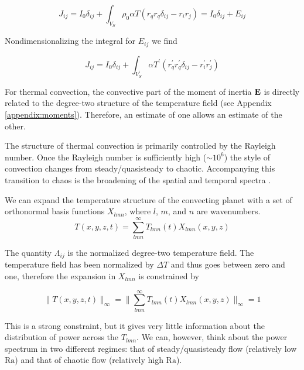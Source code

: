 \documentclass[extra,onecolumn]{gji}
\begin{document}
\begin{equation}
J_{ij} = I_0 \delta_{ij} + \int_{V_S} \rho_0 \alpha T \left( r_q r_q \delta_{ij} - r_i r_j \right) = I_0 \delta_{ij} + E_{ij} 
\end{equation}

Nondimensionalizing the integral for $E_{ij}$ we find

\begin{equation}
J_{ij} = I_0 \delta_{ij} + \int_{V_S^\prime} \alpha T^\prime \left( r_q^\prime r_q^\prime \delta_{ij} - r_i^\prime r_j^\prime \right) 
\end{equation}


For thermal convection, the convective part of the moment of inertia $\bf E$ is directly related to the degree-two structure of the temperature field (see Appendix \ref{appendix:moments}).
Therefore, an estimate of one allows an estimate of the other.


The structure of thermal convection is primarily controlled by the Rayleigh number.  Once the Rayleigh number is sufficiently high ($\sim10^6$) 
the style of convection changes from steady/quasisteady to chaotic.  Accompanying this transition to chaos is the broadening of the spatial 
and temporal spectra \citep{mclaughlin1982transition}.  

We can expand the temperature structure of the convecting planet with a set of orthonormal basis functions $X_{lmn}$, 
where $l$, $m$, and $n$ are wavenumbers.  
\begin{equation} 
T( x, y ,z, t )  = {\displaystyle \sum_{l m n}^\infty } T_{lmn}(t) X_{lmn} (x , y, z)
\label{T_series}
\end{equation}

The quantity $\Lambda_{ij}$ is the normalized degree-two temperature field.  The temperature field has been normalized by $\Delta T$ and thus goes between zero and one, therefore the expansion in $X_{lmn}$ is constrained by

\begin{equation}
\lVert T(x,y,z, t) \rVert_\infty = \lVert {\displaystyle \sum_{l m n}^\infty } T_{lmn} (t) X_{lmn} (x , y, z) \rVert_\infty = 1
\end{equation}

This is a strong constraint, but it gives very little information about the distribution of power across the $T_{lmn}$.  We can, however, think about the power spectrum in two different regimes: that of steady/quasisteady flow (relatively low $\mathrm{Ra}$) and that of chaotic flow (relatively high $\mathrm{Ra}$).
\end{document}
